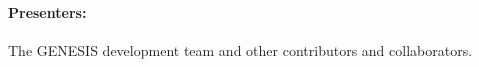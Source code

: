 \documentclass[12pt]{article}
\begin{document}













\paragraph*{Presenters:}
The GENESIS development team and other contributors and collaborators.
\end{document}
